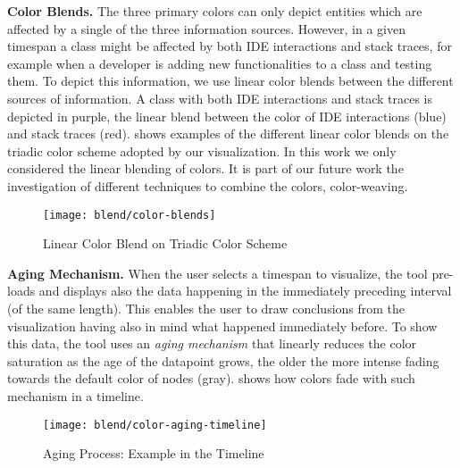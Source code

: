 {\bfseries Color Blends.} The three primary colors can only depict entities which are affected by a single of the three information sources. However, in a given timespan a class might be affected by both IDE interactions and stack traces, for example when a developer is adding new functionalities to a class and testing them. To depict this information, we use linear color blends between the different sources of information. A class with both IDE interactions and stack traces is depicted in purple, the linear blend between the color of IDE interactions (\ie blue) and stack traces (\ie red).  shows examples of the different linear color blends on the triadic color scheme adopted by our visualization. In this work we only considered the linear blending of colors. It is part of our future work the investigation of different techniques to combine the colors, \ie color-weaving.

\begin{figure}[ht]
\centering
\texttt{[image: blend/color-blends]}
\caption{Linear Color Blend on Triadic Color Scheme}
\label{fig:color-blends}
\end{figure}


{\bfseries Aging Mechanism.} When the user selects a timespan to visualize, the tool pre-loads and displays also the data happening in the immediately preceding interval (of the same length). This enables the user to draw conclusions from the visualization having also in mind what happened immediately before. To show this data, the tool uses an \emph{aging mechanism} that linearly reduces the color saturation as the age of the datapoint grows, \ie the older the more intense fading towards the default color of nodes (\ie gray).  shows how colors fade with such mechanism in a timeline.

\begin{figure}[h!]
\centering
\texttt{[image: blend/color-aging-timeline]}
\caption{Aging Process: Example in the Timeline}
\label{fig:color-aging-timeline}
\end{figure}


